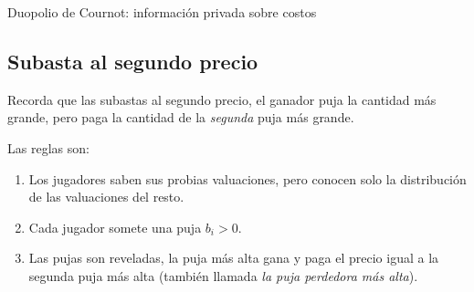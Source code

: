 \documentclass[12pt]{article}
\begin{document}
\begin{exbox}{Duopolio de Cournot: información privada sobre costos}






\end{exbox}

\subsection{Subasta al segundo precio}

Recorda que las subastas al segundo precio, el ganador puja la cantidad más grande, pero paga la cantidad de la \textit{segunda} puja más grande.

Las reglas son: %

\begin{enumerate}
	\setlength{\itemsep}{0pt}
	\setlength{\parskip}{0pt}
	\setlength{\parsep}{0pt}
	\item Los jugadores saben sus probias valuaciones, pero conocen solo la distribución de las valuaciones del resto.
	\item Cada jugador somete una puja $ b_i >0 $.
	\item Las pujas son reveladas, la puja más alta gana y paga el precio igual a la segunda puja más alta (también llamada \textit{la puja perdedora más alta}).
\end{enumerate}
\end{document}
